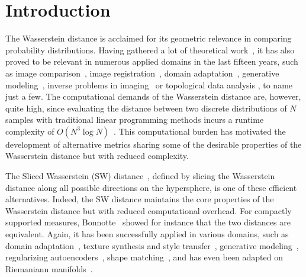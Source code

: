 \section{Introduction}

The Wasserstein distance is acclaimed for its geometric relevance in comparing probability distributions. Having gathered a lot of theoretical work~\citep{santambrogio2015optimal,villani2008optimal}, it has also proved to be relevant in numerous applied domains in the last fifteen years, such as image comparison~\citep{rabin2009statistical}, image registration~\citep{feydy2017optimal}, domain adaptation~\citep{courty2016optimal}, generative modeling~\citep{arjovsky2017wasserstein,gulrajani2017improved,salimans2018improving}, inverse problems in imaging~\citep{hertrich2022wasserstein} or topological data analysis \citep{edelsbrunner09,ensembleBenchmark}, to name just a few. The computational demands of the Wasserstein distance are, however, quite high, since evaluating the distance between two discrete distributions of $N$ samples with traditional linear programming methods incurs a runtime complexity of \(O(N^3 \log N)\)~\citep{peyre2019computational}. This computational burden has motivated the development of alternative metrics sharing some of the {desirable} properties of the Wasserstein distance but with reduced complexity.

The Sliced Wasserstein (SW) 
distance~\citep{Rabin_texture_mixing_sw,bonneel2015sliced}, defined by slicing 
the Wasserstein distance along all possible directions on the hypersphere, is 
one of these efficient alternatives. Indeed, 
{the SW}
distance maintains the core properties of the 
Wasserstein distance but with reduced computational overhead. For compactly 
supported measures, Bonnotte~\citep{bonnotte2013phd} showed for instance that 
the two distances are equivalent. Again, it has been successfully applied in 
various domains, such as domain adaptation~\citep{lee2019sliced}, texture 
synthesis and style transfer~\citep{heitz2021sliced,Elnekave:2022aa}, generative 
modeling~\citep{deshpande2018generative,wu2019sliced}, regularizing 
autoencoders~\citep{kolouri2018sliced}, shape 
matching~\citep{le2024integrating}, and has even been adapted on Riemaniann 
manifolds~\citep{bonet2024sliced}.

